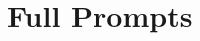 \documentclass{article} %
\begin{document}



\clearpage
\section{Full Prompts}
\label{appendix:full prompts}
\end{document}
